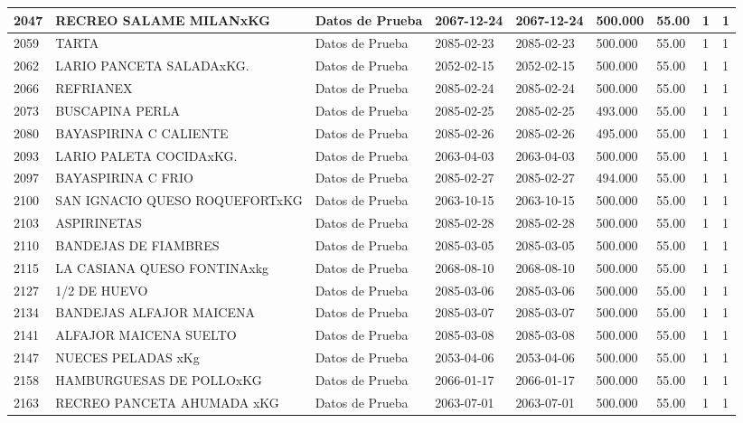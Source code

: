 \documentclass[a4paper,12pt]{article}
\begin{document}
\begin{landscape}
\begin{longtable}{|p{4cm}|p{2.5cm}|p{2.5cm}|p{1.8cm}|p{1.8cm}|p{1cm}|p{1cm}|p{3cm}|p{3cm}||}
2047 & RECREO SALAME MILANxKG & Datos de Prueba & 2067-12-24 & 2067-12-24 & 500.000 & 55.00 & 1 & 1 \\ \hline 
2059 & TARTA & Datos de Prueba & 2085-02-23 & 2085-02-23 & 500.000 & 55.00 & 1 & 1 \\ \hline 
2062 & LARIO PANCETA SALADAxKG. & Datos de Prueba & 2052-02-15 & 2052-02-15 & 500.000 & 55.00 & 1 & 1 \\ \hline 
2066 & REFRIANEX & Datos de Prueba & 2085-02-24 & 2085-02-24 & 500.000 & 55.00 & 1 & 1 \\ \hline 
2073 & BUSCAPINA   PERLA & Datos de Prueba & 2085-02-25 & 2085-02-25 & 493.000 & 55.00 & 1 & 1 \\ \hline 
2080 & BAYASPIRINA  C  CALIENTE & Datos de Prueba & 2085-02-26 & 2085-02-26 & 495.000 & 55.00 & 1 & 1 \\ \hline 
2093 & LARIO PALETA COCIDAxKG. & Datos de Prueba & 2063-04-03 & 2063-04-03 & 500.000 & 55.00 & 1 & 1 \\ \hline 
2097 & BAYASPIRINA   C  FRIO & Datos de Prueba & 2085-02-27 & 2085-02-27 & 494.000 & 55.00 & 1 & 1 \\ \hline 
2100 & SAN IGNACIO QUESO ROQUEFORTxKG & Datos de Prueba & 2063-10-15 & 2063-10-15 & 500.000 & 55.00 & 1 & 1 \\ \hline 
2103 & ASPIRINETAS & Datos de Prueba & 2085-02-28 & 2085-02-28 & 500.000 & 55.00 & 1 & 1 \\ \hline 
2110 & BANDEJAS DE FIAMBRES & Datos de Prueba & 2085-03-05 & 2085-03-05 & 500.000 & 55.00 & 1 & 1 \\ \hline 
2115 & LA CASIANA QUESO FONTINAxkg & Datos de Prueba & 2068-08-10 & 2068-08-10 & 500.000 & 55.00 & 1 & 1 \\ \hline 
2127 & 1/2 DE HUEVO & Datos de Prueba & 2085-03-06 & 2085-03-06 & 500.000 & 55.00 & 1 & 1 \\ \hline 
2134 & BANDEJAS ALFAJOR MAICENA & Datos de Prueba & 2085-03-07 & 2085-03-07 & 500.000 & 55.00 & 1 & 1 \\ \hline 
2141 & ALFAJOR MAICENA SUELTO & Datos de Prueba & 2085-03-08 & 2085-03-08 & 500.000 & 55.00 & 1 & 1 \\ \hline 
2147 & NUECES PELADAS xKg & Datos de Prueba & 2053-04-06 & 2053-04-06 & 500.000 & 55.00 & 1 & 1 \\ \hline 
2158 & HAMBURGUESAS DE POLLOxKG & Datos de Prueba & 2066-01-17 & 2066-01-17 & 500.000 & 55.00 & 1 & 1 \\ \hline 
2163 & RECREO PANCETA AHUMADA xKG & Datos de Prueba & 2063-07-01 & 2063-07-01 & 500.000 & 55.00 & 1 & 1 \\ \hline 

\end{longtable}
\end{landscape}
\end{document}
